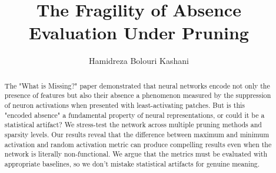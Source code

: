 \documentclass[sigconf,natbib=false,nonacm]{acmart}
\begin{document}
\title[Fragility of Absence]{The Fragility of Absence Evaluation Under Pruning}

\author{Hamidreza Bolouri Kashani}


\begin{abstract}
The "What is Missing?" paper demonstrated that neural networks encode not only the presence of features but also their absence  a phenomenon measured by the suppression of neuron activations when presented with least-activating patches. But is this "encoded absence" a fundamental property of neural representations, or could it be a statistical artifact? We stress-test the network across multiple pruning methods and sparsity levels. Our results reveal that the difference between maximum and minimum activation and random activation metric can produce compelling results even when the network is literally non-functional. We argue that the metrics must be evaluated with appropriate baselines, so we don't mistake statistical artifacts for genuine meaning.
\end{abstract}


\maketitle

\renewcommand{\shortauthors}{ }



\printbibliography
\end{document}
